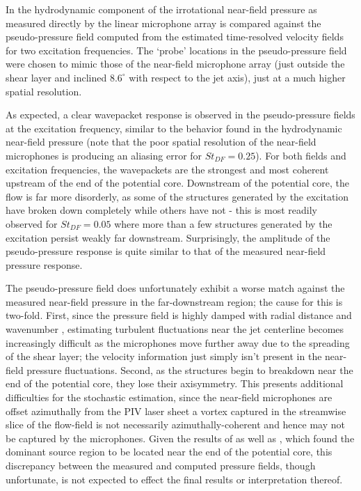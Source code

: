 In  the hydrodynamic component of the irrotational near-field pressure as measured directly by the linear microphone array is compared against the pseudo-pressure field computed from the estimated time-resolved velocity fields for two excitation frequencies. 
The `probe' locations in the pseudo-pressure field were chosen to mimic those of the near-field microphone array (just outside the shear layer and inclined $8.6^\circ$ with respect to the jet axis), just at a much higher spatial resolution.

As expected, a clear wavepacket response is observed in the pseudo-pressure fields at the excitation frequency, similar to the behavior found in the hydrodynamic near-field pressure (note that the poor spatial resolution of the near-field microphones is producing an aliasing error for $St_{DF}=0.25$).
For both fields and excitation frequencies, the wavepackets are the strongest and most coherent upstream of the end of the potential core.
Downstream of the potential core, the flow is far more disorderly, as some of the structures generated by the excitation have broken down completely while others have not - this is most readily observed for $St_{DF}=0.05$ where more than a few structures generated by the excitation persist weakly far downstream.
Surprisingly, the amplitude of the pseudo-pressure response is quite similar to that of the measured near-field pressure response.

The pseudo-pressure field does unfortunately exhibit a worse match against the measured near-field pressure in the far-downstream region; the cause for this is two-fold.
First, since the pressure field is highly damped with radial distance and wavenumber \citep{Arndt1997}, estimating turbulent fluctuations near the jet centerline becomes increasingly difficult as the microphones move further away due to the spreading of the shear layer; the velocity information just simply isn't present in the near-field pressure fluctuations.
Second, as the structures begin to breakdown near the end of the potential core, they lose their axisymmetry.
This presents additional difficulties for the stochastic estimation, since the near-field microphones are offset azimuthally from the PIV laser sheet a vortex captured in the streamwise slice of the flow-field is not
necessarily azimuthally-coherent and hence may not be captured by the microphones.
Given the results of  as well as \citet{Hileman2005}, which found the dominant source region to be located near the end of the potential core, this discrepancy between the measured and computed pressure fields, though unfortunate, is not expected to effect the final results or interpretation thereof.  

